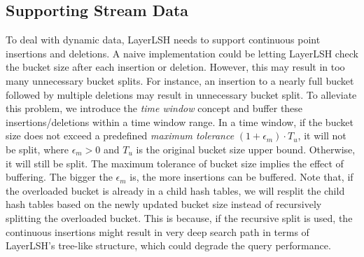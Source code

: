 \vspace{-0.1in}
\subsection{Supporting Stream Data}
\label{sec:layerlsh:stream}

To deal with dynamic data, LayerLSH needs to support continuous point insertions and deletions. A naive implementation could be letting LayerLSH check the bucket size after each insertion or deletion. However, this may result in too many unnecessary bucket splits. For instance, an insertion to a nearly full bucket followed by multiple deletions may result in unnecessary bucket split. To alleviate this problem, we introduce the \textit{time window} concept and buffer these insertions/deletions within a time window range. In a time window, if the bucket size does not exceed a predefined \textit{maximum tolerance} $(1+\epsilon_m)\cdot T_u$, it will not be split, where $\epsilon_m>0$ and $T_u$ is the original bucket size upper bound. Otherwise, it will still be split. The maximum tolerance of bucket size implies the effect of buffering. The bigger the $\epsilon_m$ is, the more insertions can be buffered. Note that, if the overloaded bucket is already in a child hash tables, we will resplit the child hash tables based on the newly updated bucket size instead of recursively splitting the overloaded bucket. This is because, if the recursive split is used, the continuous insertions might result in very deep search path in terms of LayerLSH's tree-like structure, which could degrade the query performance.


